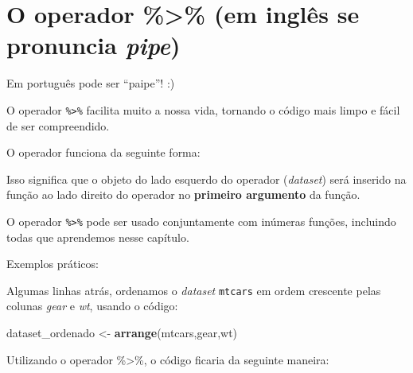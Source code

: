 \documentclass[
]{book}
\newenvironment{Shaded}{\begin{snugshade}}{\end{snugshade}}
\newcommand{\CommentTok}[1]{\textcolor[rgb]{0.56,0.35,0.01}{\textit{#1}}}
\newcommand{\KeywordTok}[1]{\textcolor[rgb]{0.13,0.29,0.53}{\textbf{#1}}}
\newcommand{\NormalTok}[1]{#1}
\newcommand{\OperatorTok}[1]{\textcolor[rgb]{0.81,0.36,0.00}{\textbf{#1}}}
\newcommand{\StringTok}[1]{\textcolor[rgb]{0.31,0.60,0.02}{#1}}
\begin{document}
\hypertarget{o-operador-em-ingluxeas-se-pronuncia-pipe}{%
\section{\texorpdfstring{O operador \%\textgreater\% (em inglês se
pronuncia
\emph{pipe})}{O operador \%\textgreater\% (em inglês se pronuncia pipe)}}\label{o-operador-em-ingluxeas-se-pronuncia-pipe}}

Em português pode ser ``paipe''! :)

O operador \texttt{\%\textgreater{}\%} facilita muito a nossa vida,
tornando o código mais limpo e fácil de ser compreendido.

O operador funciona da seguinte forma:

\begin{Shaded}
\end{Shaded}

Isso significa que o objeto do lado esquerdo do operador
(\emph{dataset}) será inserido na função ao lado direito do operador no
\textbf{primeiro argumento} da função.

O operador \texttt{\%\textgreater{}\%} pode ser usado conjuntamente com
inúmeras funções, incluindo todas que aprendemos nesse capítulo.

Exemplos práticos:

Algumas linhas atrás, ordenamos o \emph{dataset} \texttt{mtcars} em
ordem crescente pelas colunas \emph{gear} e \emph{wt}, usando o código:

\begin{Shaded}
\begin{Highlighting}[]
\NormalTok{dataset_ordenado <-}\StringTok{ }\KeywordTok{arrange}\NormalTok{(mtcars,gear,wt)}
\end{Highlighting}
\end{Shaded}

Utilizando o operador \%\textgreater\%, o código ficaria da seguinte
maneira:

\begin{Shaded}
\end{Shaded}
\end{document}
